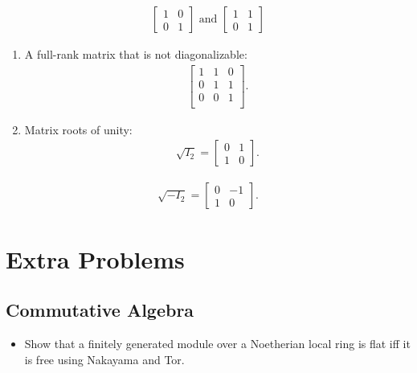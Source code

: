 \begin{align*}
\left[\begin{array}{ll}
{1}  & {0} \\
{0} & {1}
 \end{array}\right]
 \text { and }
 \left[\begin{array}{ll}
 {1} & {1} \\
 {0} & {1}
  \end{array}\right]
\end{align*}

\begin{enumerate}
\def\labelenumi{\arabic{enumi}.}
\setcounter{enumi}{3}
\item
  A full-rank matrix that is not diagonalizable:
  \begin{align*}     \left[\begin{array}{ccc}     1 & 1 & 0 \\     0 & 1 & 1 \\     0 & 0 & 1 \\     \end{array}\right]     .\end{align*}
\item
  Matrix roots of unity:
  \begin{align*} \sqrt{I_2} =     \left[\begin{array}{cc}     0 & 1\\     1 & 0     \end{array}\right]     .\end{align*}
\end{enumerate}

\begin{align*} \sqrt{-I_2} = \left[\begin{array}{cc} 0 & -1\\ 1 & 0 \end{array}\right] .\end{align*}

\hypertarget{extra-problems}{%
\section{Extra Problems}\label{extra-problems}}

\hypertarget{commutative-algebra}{%
\subsection{Commutative Algebra}\label{commutative-algebra}}

\begin{itemize}
\tightlist
\item
  Show that a finitely generated module over a Noetherian local ring is
  flat iff it is free using Nakayama and Tor.
\end{itemize}

